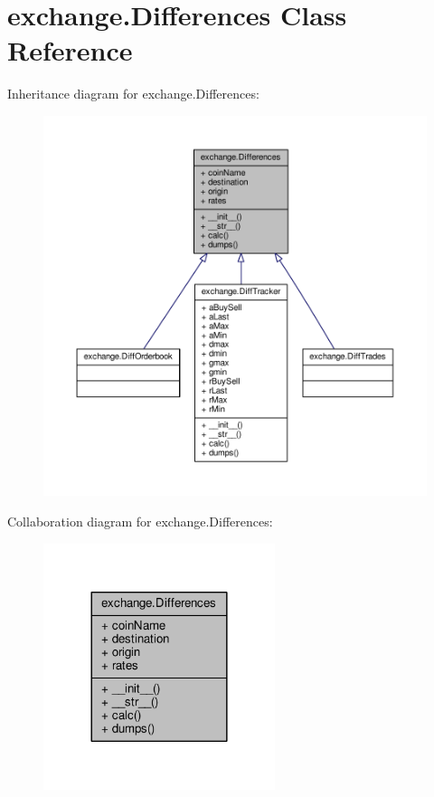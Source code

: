 \hypertarget{classexchange_1_1_differences}{}\section{exchange.\+Differences Class Reference}
\label{classexchange_1_1_differences}


Inheritance diagram for exchange.\+Differences\+:\nopagebreak
\begin{figure}[H]
\begin{center}
\leavevmode
\includegraphics[width=350pt]{classexchange_1_1_differences__inherit__graph}
\end{center}
\end{figure}


Collaboration diagram for exchange.\+Differences\+:\nopagebreak
\begin{figure}[H]
\begin{center}
\leavevmode
\includegraphics[width=192pt]{classexchange_1_1_differences__coll__graph}
\end{center}
\end{figure}
